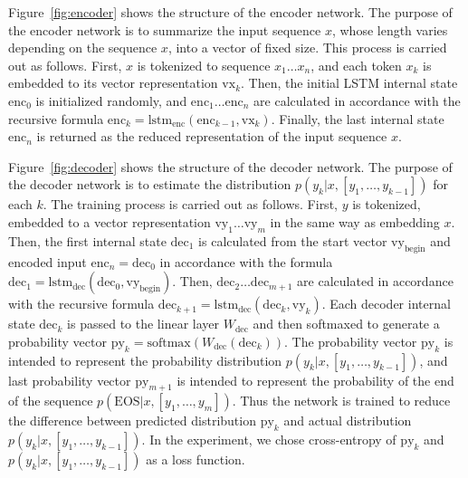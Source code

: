 \documentclass[11pt]{jarticle}
\begin{document}
Figure~\ref{fig:encoder} shows the structure of the encoder network.  The purpose of the encoder network is to summarize the input sequence $x$, whose length varies depending on the sequence $x$, into a vector of fixed size.
This process is carried out as follows. 
First, $x$ is tokenized to sequence $x_{1} \dots x_{n}$, and each token $x_{k}$ is embedded to its vector representation $\mathrm{vx}_{k}$. 
Then, the initial LSTM internal state $\mathrm{enc}_0$ is initialized randomly, 
and $ \mathrm{enc}_{1} \dots \mathrm{enc}_{n} $ are calculated in accordance with the recursive formula $ \mathrm{enc}_{k} = \mathrm{lstm}_{\mathrm{enc}}(\mathrm{enc}_{k-1},\mathrm{vx}_{k}) $.
Finally, the last internal state $ \mathrm{enc}_{n}$ is returned as the reduced representation of the input sequence $x$.

Figure~\ref{fig:decoder} shows the structure of the decoder network.  The purpose of the decoder network is to estimate the distribution $ p(y_k|x,[y_1,\dots,y_{k-1}]) $ for each $ k $. 
The training process is carried out as follows. 
First, $y$ is tokenized, embedded to a vector representation $\mathrm{vy}_{1} \dots \mathrm{vy}_{m}$ in the same way as embedding $x$.
Then, the first internal state $ \mathrm{dec}_{1}$ is calculated from the start vector $\mathrm{vy}_{\mathrm{begin}}$ and encoded input $ \mathrm{enc}_{n} = \mathrm{dec}_{0} $ in accordance with the formula  $ \mathrm{dec}_1 = \mathrm{lstm}_{\mathrm{dec}}(\mathrm{dec}_{0},\mathrm{vy}_{\mathrm{begin}}) $.
Then, $ \mathrm{dec}_{2} \dots \mathrm{dec}_{m+1} $ are calculated in accordance with the recursive formula $ \mathrm{dec}_{k+1} = \mathrm{lstm}_{\mathrm{dec}}(\mathrm{dec}_{k},\mathrm{vy}_{k}) $.
Each decoder internal state $ \mathrm{dec}_{k} $ is passed to the linear layer $ W_{\mathrm{dec}} $ and then softmaxed to generate a probability vector $ \mathrm{py}_{k} = \mathrm{softmax}(W_{\mathrm{dec}}(\mathrm{dec}_{k}))$.
The probability vector $ \mathrm{py}_{k} $ is intended to represent the probability distribution $ p(y_k|x,[y_1,\dots,y_{k-1}]) $,
and last probability vector $ \mathrm{py}_{m+1} $ is intended to represent the probability of the end of the sequence $ p(\mathrm{EOS}|x,[y_1,\dots,y_{m}]) $.
Thus the network is trained to reduce the difference between predicted distribution $ \mathrm{py}_{k} $ and actual distribution $ p(y_k|x,[y_1,\dots,y_{k-1}]) $.
In the experiment, we chose cross-entropy of $ \mathrm{py}_{k} $ and $ p(y_k|x,[y_1,\dots,y_{k-1}]) $ as a loss function.
\end{document}
